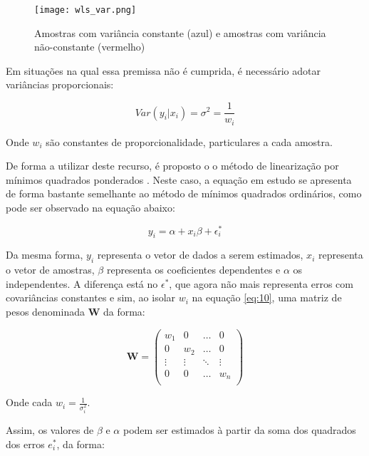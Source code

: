 \begin{figure}[htp]
    \centering
    \texttt{[image: wls\_var.png]}
    \caption{Amostras com variância constante (azul) e amostras com variância não-constante (vermelho)}
    \label{fig:outlier}
\end{figure}

Em situações na qual essa premissa não é cumprida, é necessário adotar variâncias proporcionais:

\begin{equation}\label{eq:10}
Var(y_i|x_i) = \sigma^2 = \frac{1}{w_i}
\end{equation}

Onde $w_i$ são constantes de proporcionalidade, particulares a cada amostra.

De forma a utilizar deste recurso, é proposto o o método de linearização por mínimos quadrados ponderados  \cite{reg_analysis_weighted} \cite{weighted_taconeli}. Neste caso, a equação em estudo se apresenta de forma bastante semelhante ao método de mínimos quadrados ordinários, como pode ser observado na equação abaixo:

\begin{equation}\label{eq:11}
y_i = \alpha + x_i\beta +\epsilon_i^\ast
\end{equation}

Da mesma forma, $y_i$ representa o vetor de dados a serem estimados, $x_i$ representa o vetor de amostras, $\beta$ representa os coeficientes dependentes e $\alpha$ os independentes. A diferença está no $\epsilon^\ast$, que agora não mais representa erros com covariâncias constantes e sim, ao isolar $w_i$ na equação \ref{eq:10}, uma matriz de pesos denominada \textbf{W} da forma:

\begin{equation*}\textbf{W}=\left( \begin{array}{cccc} w_{1} & 0 & \ldots & 0 \\ 0& w_{2} & \ldots & 0 \\ \vdots & \vdots & \ddots & \vdots \\ 0& 0 & \ldots & w_{n} \\ \end{array} \right) \end{equation*}

Onde cada $w_i = \frac{1}{\sigma_i^2}$.

Assim, os valores de $\beta$ e $\alpha$ podem ser estimados à partir da soma dos quadrados dos erros $e_i^\ast$, da forma:

